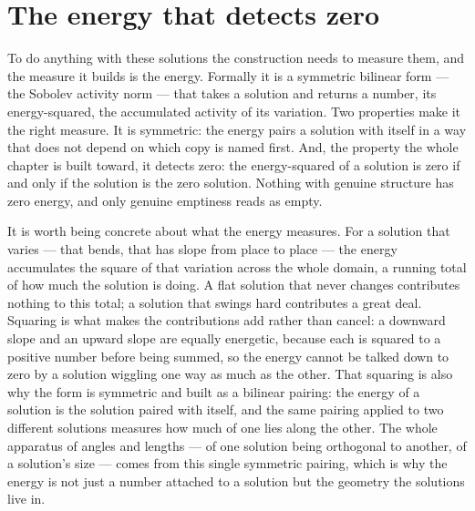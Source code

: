 \section{The energy that detects zero}
\label{se:the-energy-that-detects-zero}

To do anything with these solutions the construction needs to measure them, and the measure it builds
is the energy. Formally it is a symmetric bilinear form --- the Sobolev activity norm --- that takes a
solution and returns a number, its energy-squared, the accumulated activity of its variation. Two
properties make it the right measure. It is symmetric: the energy pairs a solution with itself in a
way that does not depend on which copy is named first. And, the property the whole chapter is built
toward, it detects zero: the energy-squared of a solution is zero if and only if the solution is the
zero solution. Nothing with genuine structure has zero energy, and only genuine emptiness reads as
empty.

It is worth being concrete about what the energy measures. For a solution that varies --- that bends,
that has slope from place to place --- the energy accumulates the square of that variation across the
whole domain, a running total of how much the solution is doing. A flat solution that never changes
contributes nothing to this total; a solution that swings hard contributes a great deal. Squaring is
what makes the contributions add rather than cancel: a downward slope and an upward slope are equally
energetic, because each is squared to a positive number before being summed, so the energy cannot be
talked down to zero by a solution wiggling one way as much as the other. That squaring is also why the
form is symmetric and built as a bilinear pairing: the energy of a solution is the solution paired with
itself, and the same pairing applied to two different solutions measures how much of one lies along the
other. The whole apparatus of angles and lengths --- of one solution being orthogonal to another, of a
solution's size --- comes from this single symmetric pairing, which is why the energy is not just a
number attached to a solution but the geometry the solutions live in.

